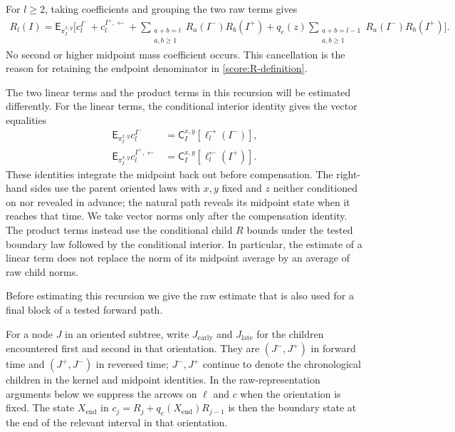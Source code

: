 For $l\ge2$, taking coefficients and grouping the two raw terms gives
\begin{equation}\label{score:midpoint-coefficient}
 \begin{split}
 R_l(I)=\mathsf E_{\pi_I^{x,y}}\bigg[
    c_l^{I^-}+c_l^{I^+,\leftarrow}
    +\sum_{\substack{a+b=l\\a,b\ge1}}R_a(I^-)R_b(I^+)
    +q_e(z)\sum_{\substack{a+b=l-1\\a,b\ge1}}R_a(I^-)R_b(I^+)
                         \bigg].
 \end{split}
\end{equation}
No second or higher midpoint mass coefficient occurs.  This cancellation
is the reason for retaining the endpoint denominator in
\eqref{score:R-definition}.

The two linear terms and the product terms in this recursion will be
estimated differently.  For the linear terms, the conditional interior
identity gives the vector equalities
\begin{equation}\label{score:raw-before-midpoint-norm}
 \begin{aligned}
 \mathsf E_{\pi_I^{x,y}}c_l^{I^-}
   &=\mathsf C_I^{x,y}[\ell_l^{\to}(I^-)],\\
 \mathsf E_{\pi_I^{x,y}}c_l^{I^+,\leftarrow}
   &=\mathsf C_I^{x,y}[\ell_l^{\leftarrow}(I^+)].
 \end{aligned}
\end{equation}
These identities integrate the midpoint back out before compensation.
The right-hand sides use the parent oriented laws with $x,y$ fixed and
$z$ neither conditioned on nor revealed in advance; the natural path
reveals its midpoint state when it reaches that time.  We take vector norms
only after the compensation identity.  The product terms instead use the
conditional child $R$ bounds under the tested boundary law followed by the
conditional interior.  In particular, the estimate of a linear term does
not replace the norm of its midpoint average by an average of raw child norms.

Before estimating this recursion we give the raw estimate that is also
used for a final block of a tested forward path.

For a node $J$ in an oriented subtree, write $J_{\mathrm{early}}$ and
$J_{\mathrm{late}}$ for the children encountered first and second in that
orientation.  They are $(J^-,J^+)$ in forward time and $(J^+,J^-)$ in
reversed time; $J^-,J^+$ continue to denote the chronological children in
the kernel and midpoint identities.  In the raw-representation arguments
below we suppress the arrows on $\ell$ and $c$ when the orientation is fixed.
The state $X_{\mathrm{end}}$ in
$c_j=R_j+q_e(X_{\mathrm{end}})R_{j-1}$ is then the boundary state at the
end of the relevant interval in that orientation.

